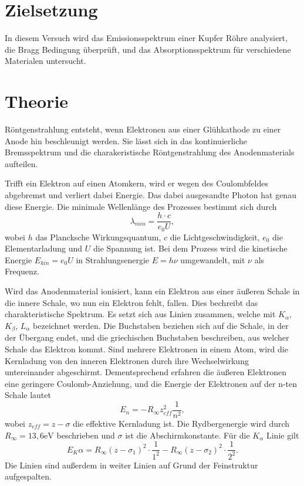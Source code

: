 \section{Zielsetzung}
\label{sec:Zielsetzung}

In diesem Versuch wird das Emissionsspektrum einer Kupfer Röhre analysiert, die Bragg Bedingung überprüft, und das Absorptionsspektrum für verschiedene Materialen untersucht.

\section{Theorie}
\label{sec:Theorie}

Röntgenstrahlung entsteht, wenn Elektronen aus einer Glühkathode zu einer Anode hin beschleunigt werden.
Sie lässt sich in das kontinuierliche Bremsspektrum und die charakeristische Röntgenstrahlung des Anodenmaterials aufteilen.


\noindent Trifft ein Elektron auf einen Atomkern, wird er wegen des Coulombfeldes abgebremst und verliert dabei Energie. 
Das dabei ausgesandte Photon hat genau diese Energie. Die minimale Wellenlänge des Prozesses bestimmt sich durch
\begin{equation}
\lambda_{min} = \frac{h\cdot c}{e_0 U},
\end{equation}
wobei $h$ das Plancksche Wirkungsquantum, $c$ die Lichtgeschwindigkeit, $e_0$ die Elementarladung und $U$ die Spannung ist.
Bei dem Prozess wird die kinetische Energie $E_{kin} = e_0 U$ in Strahlungsenergie $E = h\nu$ umgewandelt, mit $\nu$ als Frequenz.

\noindent Wird das Anodenmaterial ionisiert, kann ein Elektron aus einer äußeren Schale in die innere Schale, wo nun ein Elektron fehlt, fallen. Dies bechreibt das charakteristische Spektrum.
Es setzt sich aus Linien zusammen, welche mit $K_\alpha$, $K_\beta$, $L_\alpha$ bezeichnet werden. Die Buchstaben beziehen sich auf die Schale, in der der Übergang endet, und die griechischen Buchstaben beschreiben, aus welcher Schale das Elektron kommt.
Sind mehrere Elektronen in einem Atom, wird die Kernladung von den inneren Elektronen durch ihre Wechselwirkung untereinander abgeschirmt. Dementsprechend erfahren die äußeren Elektronen eine geringere Coulomb-Anziehung, und die Energie der Elektronen auf der n-ten Schale lautet
\begin{equation}
E_n = -R_\infty z_{eff}^2 \frac{1}{n^2},
\end{equation}
wobei $z_{eff} = z - \sigma$ die effektive Kernladung ist. Die Rydbergenergie wird durch $R_{\infty} = 13,6 \si{\eV}$ beschrieben und $\sigma$ ist die Abschirmkonstante.
Für die $K_\alpha$ Linie gilt
\begin{equation}
E_K{\alpha} = R_\infty (z-\sigma_1)^2 \cdot \frac{1}{1^2} - R_\infty (z-\sigma_2)^2 \cdot \frac{1}{2^2}.
\end{equation}
Die Linien sind außerdem in weiter Linien auf Grund der Feinstruktur aufgespalten.

